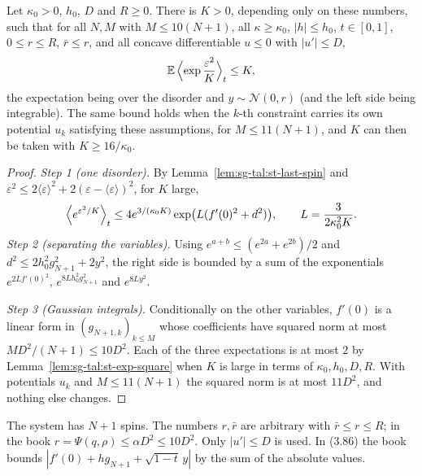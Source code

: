 \begin{theorem}\label{thm:sg-tal:st-last-spin-tail}
  \leanok
Let $\kappa_0>0$, $h_0$, $D$ and $R\ge0$. There is $K>0$, depending only on these numbers, such that for all
$N,M$ with $M\le10(N+1)$, all $\kappa\ge\kappa_0$, $|h|\le h_0$, $t\in[0,1]$, $0\le r\le R$, $\bar r\le r$,
and all concave differentiable $u\le0$ with $|u'|\le D$,
\[
\mathbb E\,\Bigl\langle\exp\frac{\varepsilon^2}{K}\Bigr\rangle_t\le K,
\]
the expectation being over the disorder and $y\sim\mathcal N(0,r)$ (and the left side being integrable).
The same bound holds when the $k$-th constraint carries its own potential $u_k$ satisfying these assumptions,
for $M\le11(N+1)$, and $K$ can then be taken with $K\ge16/\kappa_0$.
\end{theorem}
\begin{proof}
  \leanok
\emph{Step 1 (one disorder).} By Lemma~\ref{lem:sg-tal:st-last-spin} and
$\varepsilon^2\le2\langle\varepsilon\rangle^2+2(\varepsilon-\langle\varepsilon\rangle)^2$, for $K$ large,
\[
\Bigl\langle e^{\varepsilon^2/K}\Bigr\rangle_t\le4e^{3/(\kappa_0K)}\exp\bigl(L(f'(0)^2+d^2)\bigr),\qquad
L=\frac3{2\kappa_0^2K}.
\]
\emph{Step 2 (separating the variables).} Using $e^{a+b}\le(e^{2a}+e^{2b})/2$ and
$d^2\le2h_0^2g_{N+1}^2+2y^2$, the right side is bounded by a sum of the exponentials
$e^{2Lf'(0)^2}$, $e^{8Lh_0^2g_{N+1}^2}$ and $e^{8Ly^2}$.

\emph{Step 3 (Gaussian integrals).} Conditionally on the other variables, $f'(0)$ is a linear form in
$(g_{N+1,k})_{k\le M}$ whose coefficients have squared norm at most $MD^2/(N+1)\le10D^2$. Each of the three
expectations is at most $2$ by Lemma~\ref{lem:sg-tal:st-exp-square} when $K$ is large in terms of
$\kappa_0,h_0,D,R$. With potentials $u_k$ and $M\le11(N+1)$ the squared norm is at most $11D^2$, and nothing else
changes.
\end{proof}

\begin{remark}\label{rem:sg-tal:st-lemma-326}
The system has $N+1$ spins. The numbers $r,\bar r$ are arbitrary with $\bar r\le r\le R$; in the book
$r=\Psi(q,\rho)\le\alpha D^2\le10D^2$. Only $|u'|\le D$ is used. In (3.86) the book bounds
$|f'(0)+hg_{N+1}+\sqrt{1-t}\,y|$ by the sum of the absolute values.
\end{remark}

